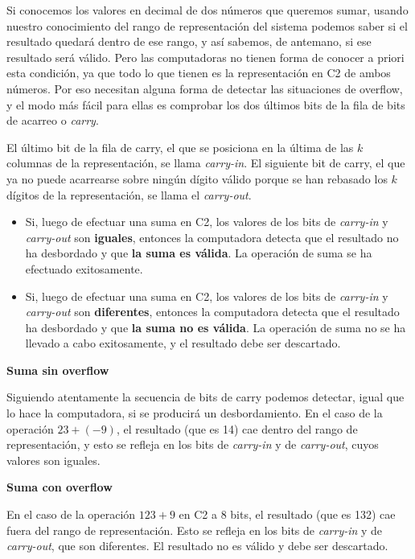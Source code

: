 \documentclass[spanish,A4,]{article}
\begin{document}
Si conocemos los valores en decimal de dos números que queremos sumar,
usando nuestro conocimiento del rango de representación del sistema
podemos saber si el resultado quedará dentro de ese rango, y así
sabemos, de antemano, si ese resultado será válido. Pero las
computadoras no tienen forma de conocer a priori esta condición, ya que
todo lo que tienen es la representación en C2 de ambos números. Por eso
necesitan alguna forma de detectar las situaciones de overflow, y el
modo más fácil para ellas es comprobar los dos últimos bits de la fila
de bits de acarreo o \emph{carry}.

El último bit de la fila de carry, el que se posiciona en la última de
las $k$ columnas de la representación, se llama \emph{carry-in}. El
siguiente bit de carry, el que ya no puede acarrearse sobre ningún
dígito válido porque se han rebasado los $k$ dígitos de la
representación, se llama el \emph{carry-out}.

\begin{itemize}
\itemsep1pt\parskip0pt
\item
  Si, luego de efectuar una suma en C2, los valores de los bits de
  \emph{carry-in} y \emph{carry-out} son \textbf{iguales}, entonces la
  computadora detecta que el resultado no ha desbordado y que \textbf{la
  suma es válida}. La operación de suma se ha efectuado exitosamente.
\item
  Si, luego de efectuar una suma en C2, los valores de los bits de
  \emph{carry-in} y \emph{carry-out} son \textbf{diferentes}, entonces
  la computadora detecta que el resultado ha desbordado y que \textbf{la
  suma no es válida}. La operación de suma no se ha llevado a cabo
  exitosamente, y el resultado debe ser descartado.
\end{itemize}

\textbf{Suma sin overflow}

Siguiendo atentamente la secuencia de bits de carry podemos detectar,
igual que lo hace la computadora, si se producirá un desbordamiento. En
el caso de la operación $23 + (-9)$, el resultado (que es 14) cae dentro
del rango de representación, y esto se refleja en los bits de
\emph{carry-in} y de \emph{carry-out}, cuyos valores son iguales.

\textbf{Suma con overflow}

En el caso de la operación $123 + 9$ en C2 a 8 bits, el resultado (que
es 132) cae fuera del rango de representación. Esto se refleja en los
bits de \emph{carry-in} y de \emph{carry-out}, que son diferentes. El
resultado no es válido y debe ser descartado.
\end{document}
